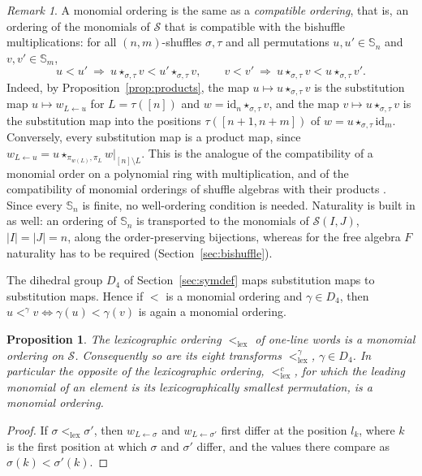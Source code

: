 \documentclass[11pt]{amsart}
\newtheorem{proposition}[theorem]{Proposition}
\theoremstyle{definition}
\theoremstyle{remark}
\newtheorem{remark}[theorem]{Remark}
\newcommand{\bS}{\mathbb{S}}
\newcommand{\cS}{\mathscr{S}}
\newcommand{\id}{\mathrm{id}}
\newcommand{\lex}{\mathrm{lex}}
\begin{document}
\begin{remark}\label{rem:compatible}
A monomial ordering is the same as a \emph{compatible ordering}, that is, an ordering of the monomials of $\cS$ that is compatible with the bishuffle multiplications: for all $(n,m)$-shuffles $\sigma,\tau$ and all permutations $u,u'\in\bS_n$ and $v,v'\in\bS_m$,
\[
u<u'\ \Longrightarrow\ u\star_{\sigma,\tau}v<u'\star_{\sigma,\tau}v,\qquad v<v'\ \Longrightarrow\ u\star_{\sigma,\tau}v<u\star_{\sigma,\tau}v' .
\]
Indeed, by Proposition~\ref{prop:products}, the map $u\mapsto u\star_{\sigma,\tau}v$ is the substitution map $u\mapsto w_{L\leftarrow u}$ for $L=\tau([n])$ and $w=\id_n\star_{\sigma,\tau}v$, and the map $v\mapsto u\star_{\sigma,\tau}v$ is the substitution map into the positions $\tau([n+1,n+m])$ of $w=u\star_{\sigma,\tau}\id_m$. Conversely, every substitution map is a product map, since $w_{L\leftarrow u}=u\star_{\pi_{w(L)},\pi_L}w|_{[n]\setminus L}$. This is the analogue of the compatibility of a monomial order on a polynomial ring with multiplication, and of the compatibility of monomial orderings of shuffle algebras with their products \cite{DK}. Since every $\bS_n$ is finite, no well-ordering condition is needed. Naturality is built in as well: an ordering of $\bS_n$ is transported to the monomials of $\cS(I,J)$, $|I|=|J|=n$, along the order-preserving bijections, whereas for the free algebra $F$ naturality has to be required (Section~\ref{sec:bishuffle}).
\end{remark}

The dihedral group $D_4$ of Section~\ref{sec:symdef} maps substitution maps to substitution maps. Hence if $<$ is a monomial ordering and $\gamma\in D_4$, then $u<^\gamma v\iff\gamma(u)<\gamma(v)$ is again a monomial ordering.

\begin{proposition}\label{prop:lex}
The lexicographic ordering $<_{\lex}$ of one-line words is a monomial ordering on $\cS$. Consequently so are its eight transforms $<_\lex^\gamma$, $\gamma\in D_4$. In particular the opposite of the lexicographic ordering, $<_{\lex}^c$, for which the leading monomial of an element is its lexicographically smallest permutation, is a monomial ordering.
\end{proposition}

\begin{proof}
If $\sigma<_\lex\sigma'$, then $w_{L\leftarrow\sigma}$ and $w_{L\leftarrow\sigma'}$ first differ at the position $l_k$, where $k$ is the first position at which $\sigma$ and $\sigma'$ differ, and the values there compare as $\sigma(k)<\sigma'(k)$.
\end{proof}
\end{document}
